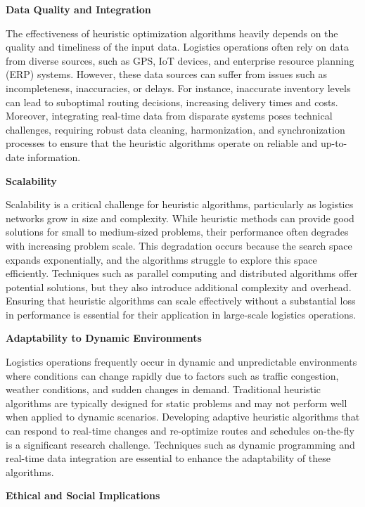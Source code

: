 \documentclass{article}
\begin{document}
    \textbf{Data Quality and Integration}

    The effectiveness of heuristic optimization algorithms heavily depends on the quality and timeliness of the input data. Logistics operations often rely on data from diverse sources, such as GPS, IoT devices, and enterprise resource planning (ERP) systems. However, these data sources can suffer from issues such as incompleteness, inaccuracies, or delays. For instance, inaccurate inventory levels can lead to suboptimal routing decisions, increasing delivery times and costs. Moreover, integrating real-time data from disparate systems poses technical challenges, requiring robust data cleaning, harmonization, and synchronization processes to ensure that the heuristic algorithms operate on reliable and up-to-date information.

    \textbf{Scalability}

    Scalability is a critical challenge for heuristic algorithms, particularly as logistics networks grow in size and complexity. While heuristic methods can provide good solutions for small to medium-sized problems, their performance often degrades with increasing problem scale. This degradation occurs because the search space expands exponentially, and the algorithms struggle to explore this space efficiently. Techniques such as parallel computing and distributed algorithms offer potential solutions, but they also introduce additional complexity and overhead. Ensuring that heuristic algorithms can scale effectively without a substantial loss in performance is essential for their application in large-scale logistics operations.

    \textbf{Adaptability to Dynamic Environments}

    Logistics operations frequently occur in dynamic and unpredictable environments where conditions can change rapidly due to factors such as traffic congestion, weather conditions, and sudden changes in demand. Traditional heuristic algorithms are typically designed for static problems and may not perform well when applied to dynamic scenarios. Developing adaptive heuristic algorithms that can respond to real-time changes and re-optimize routes and schedules on-the-fly is a significant research challenge. Techniques such as dynamic programming and real-time data integration are essential to enhance the adaptability of these algorithms.

    \textbf{Ethical and Social Implications}
\end{document}

